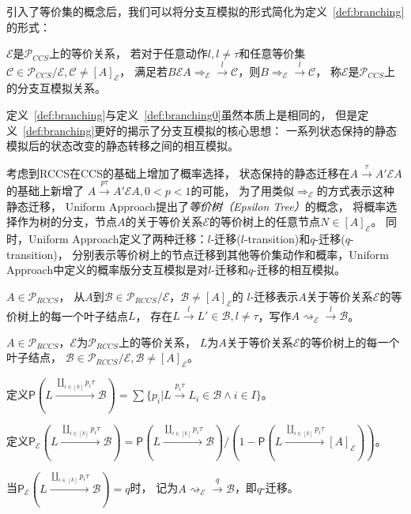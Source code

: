       引入了等价集的概念后，我们可以将分支互模拟的形式简化为定义~\ref{def:branching}的形式：
   \begin{definition}\label{def:branching}
      $\mathcal{E}$是$\mathcal{P}_{CCS}$上的等价关系，
      若对于任意动作$l,l\neq \tau$和任意等价集$\mathcal{C}\in \mathcal{P}_{CCS}/\mathcal{E}, \mathcal{C}\neq [A]_{\mathcal{E}}$，
      满足若$B\mathcal{E}A\Rightarrow_{\mathcal{E}}\stackrel{l}{\rightarrow}\mathcal{C}$，则$B\Rightarrow_{\mathcal{E}}\stackrel{l}{\rightarrow}\mathcal{C}$，
      称$\mathcal{E}$是$\mathcal{P}_{CCS}$上的分支互模拟关系。
   \end{definition}
   定义~\ref{def:branching}与定义~\ref{def:branching0}虽然本质上是相同的，
   但是定义~\ref{def:branching}更好的揭示了分支互模拟的核心思想：
   一系列状态保持的静态模拟后的状态改变的静态转移之间的相互模拟。

   考虑到RCCS在CCS的基础上增加了概率选择，
   状态保持的静态迁移在$A\stackrel{\tau}{\rightarrow}A'\mathcal{E}A$的基础上新增了
   $A\stackrel{p\tau}{\rightarrow} A'\mathcal{E}A,0<p<1$的可能，
   为了用类似$\Rightarrow_{\mathcal{E}}$的方式表示这种静态迁移，
   Uniform Approach提出了\textit{等价树（Epsilon Tree）}的概念\cite{Fu_UniformApproach}，
   将概率选择作为树的分支，节点$A$的关于等价关系$\mathcal{E}$的等价树上的任意节点$N\in [A]_{\mathcal{E}}$。
   同时，Uniform Approach定义了两种迁移：$l$-迁移($l$-transition)和$q$-迁移($q$-transition)，
   分别表示等价树上的节点迁移到其他等价集动作和概率，Uniform Approach中定义的概率版分支互模拟是对$l$-迁移和$q$-迁移的相互模拟。

   \begin{definition}[$l$-迁移($l$-transition)]
      $A\in \mathcal{P}_{RCCS}$，
      从$A$到$\mathcal{B}\in \mathcal{P}_{RCCS}/\mathcal{E}，\mathcal{B}\neq [A]_{\mathcal{E}}$的
      $l$-迁移表示$A$关于等价关系$\mathcal{E}$的等价树上的每一个叶子结点$L$，
      存在$L\stackrel{l}{\rightarrow}L'\in\mathcal{B},l\neq \tau$，写作$A\rightsquigarrow_{\mathcal{E}}\stackrel{l}{\rightarrow}\mathcal{B}$。
   \end{definition}

   \begin{definition}[$q$-迁移($q$-transition)]
      $A\in \mathcal{P}_{RCCS}$，$\mathcal{E}$为$\mathcal{P}_{RCCS}$上的等价关系，
      $L$为$A$关于等价关系$\mathcal{E}$的等价树上的每一个叶子结点，
      $\mathcal{B}\in \mathcal{P}_{RCCS}/\mathcal{E}, \mathcal{B}\neq [A]_{\mathcal{E}}$。

      定义$\mathsf{P}(L\stackrel{\coprod_{i\in[k]}p_i\tau}{\longrightarrow}\mathcal{B})=\sum \{p_i|L\stackrel{p_i\tau}{\longrightarrow}L_i\in \mathcal{B}\wedge i\in I\}$。
      
      定义$\mathsf{P}_{\mathcal{E}}(L\stackrel{\coprod_{i\in[k]}p_i\tau}{\longrightarrow}\mathcal{B})=\mathsf{P}(L\stackrel{\coprod_{i\in[k]}p_i\tau}{\longrightarrow}\mathcal{B})/(1-\mathsf{P}(L\stackrel{\coprod_{i\in[k]}p_i\tau}{\longrightarrow}[A]_{\mathcal{E}}))$。

      当$\mathsf{P}_{\mathcal{E}}(L\stackrel{\coprod_{i\in[k]}p_i\tau}{\longrightarrow}\mathcal{B})=q$时，
      记为$A\rightsquigarrow_{\mathcal{E}}\stackrel{q}{\rightarrow}\mathcal{B}$，即$q$-迁移。
   \end{definition}

